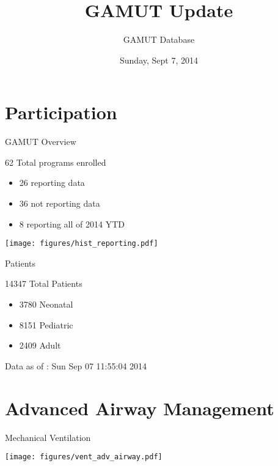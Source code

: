 \documentclass[ignorenonframetext,]{beamer}
\title{GAMUT Update}
\author{GAMUT Database}
\date{Sunday, Sept 7, 2014}
\makeatletter
\def\maxwidth{\ifdim\Gin@nat@width>\linewidth\linewidth\else\Gin@nat@width\fi}
\def\maxheight{\ifdim\Gin@nat@height>\textheight0.8\textheight\else\Gin@nat@height\fi}
\renewcommand{\includegraphics}[2][]{%
    \Oldincludegraphics[#1,width=\maxwidth,height=\maxheight,keepaspectratio]{#2}}
\makeatother
\begin{document}
\frame{\titlepage}

\section{Participation}\label{participation}

\begin{frame}{GAMUT Overview}

\begin{block}{62 Total programs enrolled}

\begin{itemize}
\item
  26 reporting data\\
\item
  36 not reporting data
\item
  8 reporting all of 2014 YTD
\end{itemize}

\texttt{[image: figures/hist\_reporting.pdf]}

\end{block}

\end{frame}

\begin{frame}{Patients}

\begin{block}{14347 Total Patients}

\begin{itemize}
\itemsep1pt\parskip0pt
\item
  3780 Neonatal\\
\item
  8151 Pediatric\\
\item
  2409 Adult
\end{itemize}

Data as of : Sun Sep 07 11:55:04 2014

\end{block}

\end{frame}

\section{Advanced Airway Management}\label{advanced-airway-management}

\begin{frame}{Mechanical Ventilation}

\texttt{[image: figures/vent\_adv\_airway.pdf]}

\end{frame}
\end{document}

